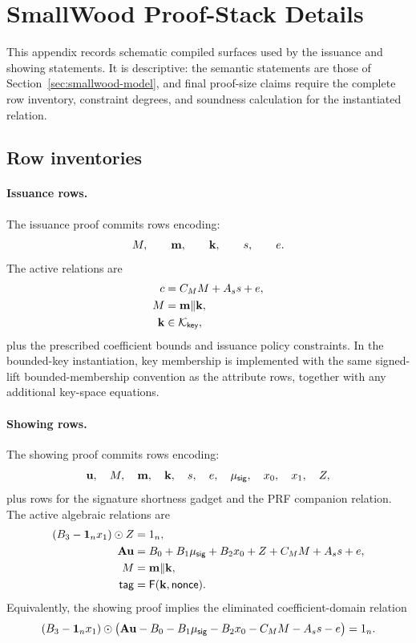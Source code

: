 \section{SmallWood Proof-Stack Details}
\label{app:smallwood}

This appendix records schematic compiled surfaces used by the issuance and showing statements.  It is descriptive:
the semantic statements are those of Section~\ref{sec:smallwood-model}, and final proof-size claims require the
complete row inventory, constraint degrees, and soundness calculation for the instantiated relation.

\subsection{Row inventories}
\paragraph{Issuance rows.}
The issuance proof commits rows encoding:
\[
  M,
  \qquad
  \mathbf{m},
  \qquad
  \mathbf{k},
  \qquad
  s,
  \qquad
  e.
\]
The active relations are
\begin{align*}
  c&=C_MM+A_s s+e,\\
  M&=\mathbf{m}\Vert\mathbf{k},\\
  \mathbf{k}&\in\mathcal K_{\mathsf{key}},
\end{align*}
plus the prescribed coefficient bounds and issuance policy constraints.  In the bounded-key instantiation, key
membership is implemented with the same signed-lift bounded-membership convention as the attribute rows, together
with any additional key-space equations.

\paragraph{Showing rows.}
The showing proof commits rows encoding:
\[
  \mathbf{u},
  \quad
  M,
  \quad
  \mathbf{m},
  \quad
  \mathbf{k},
  \quad
  s,
  \quad
  e,
  \quad
  \mu_{\mathsf{sig}},
  \quad
  x_0,
  \quad
  x_1,
  \quad
  Z,
\]
plus rows for the signature shortness gadget and the PRF companion relation.  The active algebraic relations are
\begin{align*}
  (B_3-\mathbf 1_nx_1)\odot Z&=1_n,\\
  \mathbf{A}\mathbf{u}&=B_0+B_1\mu_{\mathsf{sig}}+B_2x_0+Z+C_MM+A_s s+e,\\
  M&=\mathbf{m}\Vert\mathbf{k},\\
  \mathsf{tag}&=\mathsf{F}(\mathbf{k},\mathsf{nonce}).
\end{align*}
Equivalently, the showing proof implies the eliminated coefficient-domain relation
\[
  (B_3-\mathbf 1_nx_1)\odot
  \bigl(\mathbf{A}\mathbf{u}-B_0-B_1\mu_{\mathsf{sig}}-B_2x_0-C_MM-A_s s-e\bigr)=1_n.
\]

